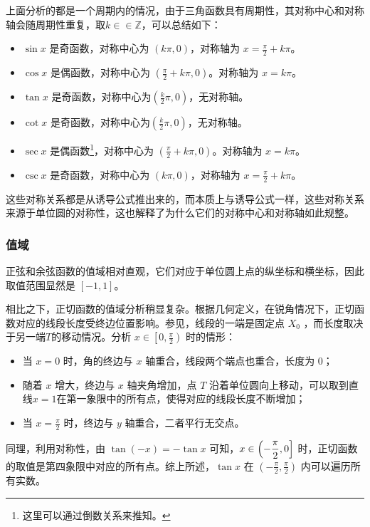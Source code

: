上面分析的都是一个周期内的情况，由于三角函数具有周期性，其对称中心和对称轴会随周期性重复，取$k\in\in\mathbb{Z}$，可以总结如下：
\begin{itemize}
\item $\sin x$ 是奇函数，对称中心为 $(k\pi,0)$，对称轴为 $x = \displaystyle\frac{\pi}{2} + k\pi$。
\item $\cos x$ 是偶函数，对称中心为 $\displaystyle \left(\frac{\pi}{2} + k\pi,0\right)$。对称轴为 $x = k\pi$。
\item $\tan x$ 是奇函数，对称中心为$\displaystyle \left(\frac{k}{2}\pi ,0\right)$，无对称轴。
\item $\cot x$ 是奇函数，对称中心为$\displaystyle \left(\frac{k}{2}\pi ,0\right)$，无对称轴。
\item $\sec x$ 是偶函数\footnote{这里可以通过倒数关系来推知。}，对称中心为 $\displaystyle \left(\frac{\pi}{2} + k\pi,0\right)$。对称轴为 $x = k\pi$。
\item $\csc x$ 是奇函数，对称中心为 $(k\pi,0)$，对称轴为 $x = \displaystyle\frac{\pi}{2} + k\pi$。
\end{itemize}

这些对称关系都是从诱导公式推出来的，而本质上与诱导公式一样，这些对称关系来源于单位圆的对称性，这也解释了为什么它们的对称中心和对称轴如此规整。

\subsubsection{值域}

正弦和余弦函数的值域相对直观，它们对应于单位圆上点的纵坐标和横坐标，因此取值范围显然是 $[-1,1]$。

相比之下，正切函数的值域分析稍显复杂。根据几何定义，在锐角情况下，正切函数对应的线段长度受终边位置影响。参见，线段的一端是固定点 $X_0$ ，而长度取决于另一端$T$的移动情况。分析 $\displaystyle x\in\left[0,\frac{\pi}{2}\right)$ 时的情形：
\begin{itemize}
\item 当 $x=0$ 时，角的终边与 $x$ 轴重合，线段两个端点也重合，长度为 $0$；
\item 随着 $x$ 增大，终边与 $x$ 轴夹角增加，点 $T$ 沿着单位圆向上移动，可以取到直线$x=1$在第一象限中的所有点，使得对应的线段长度不断增加；
\item 当 $\displaystyle x=\frac{\pi}{2}$ 时，终边与 $y$ 轴重合，二者平行无交点。
\end{itemize}
同理，利用对称性，由 $\tan(-x) = -\tan x$ 可知，$\displaystyle x\in\left(-{\pi\over2},0\right]$ 时，正切函数的取值是第四象限中对应的所有点。综上所述，$\tan x$ 在 $\displaystyle \left(-\frac{\pi}{2},\frac{\pi}{2}\right)$ 内可以遍历所有实数。

